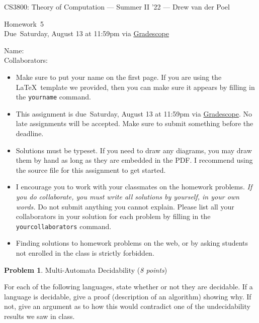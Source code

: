 \documentclass[11pt]{article}
\newcommand{\yourname}{}
\newcommand{\yourcollaborators}{}
\theoremstyle{definition}
\newcommand{\instructor}{Drew van der Poel}
\newcommand{\hwnum}{5}
\newcommand{\hwdue}{Saturday, August 13 at 11:59pm via \href{https://www.gradescope.com/courses/406943}{Gradescope}}
\theoremstyle{theorem}
\newtheorem{prob}{Problem}
\begin{document}
{\Large 
\begin{center}{CS3800: Theory of Computation} --- Summer II '22 --- \instructor \end{center}}
{\large
\vspace{10pt}
\noindent Homework~\hwnum \vspace{2pt}\\
Due~\hwdue}

\bigskip
{\large
\noindent Name: \yourname \vspace{2pt}\\ Collaborators: \yourcollaborators}

\vspace{15pt}
\begin{itemize}

\item Make sure to put your name on the first page.  If you are using the \LaTeX~template we provided, then you can make sure it appears by filling in the \texttt{yourname} command.

\item This assignment is due~\hwdue.  No late assignments will be accepted.  Make sure to submit something before the deadline.

\item Solutions must be typeset.  If you need to draw any diagrams, you may draw them by hand as long as they are embedded in the PDF.  I recommend using the source file for this assignment to get started.

\item I encourage you to work with your classmates on the homework problems. \emph{If you do collaborate, you must write all solutions by yourself, in your own words.}  Do not submit anything you cannot explain.  Please list all your collaborators in your solution for each problem by filling in the \texttt{yourcollaborators} command.

\item Finding solutions to homework problems on the web, or by asking students not enrolled in the class is strictly forbidden.

\end{itemize}




\newpage

\begin{prob} Multi-Automata Decidability (\emph{8 points})\end{prob}

For each of the following languages, state whether or not they are decidable. If a language is decidable, give a proof (description of an algorithm) showing why. If not, give an argument as to how this would contradict one of the undecidability results we saw in class.
\end{document}
